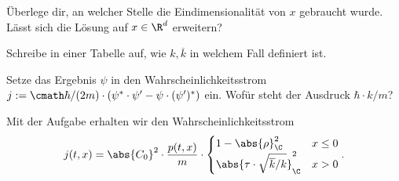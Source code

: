 \documentclass{subfiles}
\begin{document}
        \begin{Aufgabe}
            \nr{} Überlege dir, an welcher Stelle die Eindimensionalität von $x$ gebraucht wurde. Lässt sich die Lösung auf $x\in\R^d$ erweitern?

            \nr{} Schreibe in einer Tabelle auf, wie $k,\overline k$ in welchem Fall definiert ist. 

            \nr{} Setze das Ergebnis $\psi$ in den Wahrscheinlichkeitsstrom $j:=\cmath\hbar/(2m)\cdot(\psi^*\cdot\psi'-\psi\cdot(\psi')^*)$ ein. Wofür steht der Ausdruck $\hbar\cdot k/m$?
        \end{Aufgabe}
        Mit der Aufgabe erhalten wir den Wahrscheinlichkeitsstrom
        \[j(t,x) = \abs{C_0}^2\cdot \frac{p(t,x)}{m}\cdot\begin{cases}
            1-\abs{\rho}_\C^2 & x \leq 0 \\
            \abs{\tau\cdot \sqrt{\overline k/k}}_\C^2 & x > 0
        \end{cases}.\]
        
\end{document}
